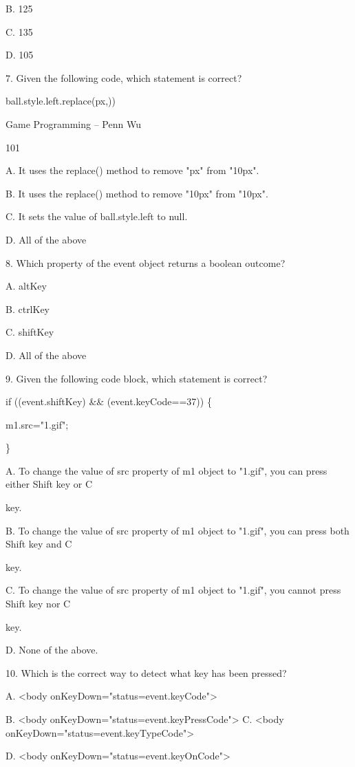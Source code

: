 \documentclass[
]{article}
\begin{document}
B. 125

C. 135

D. 105

7. Given the following code, which statement is correct?

ball.style.left.replace(\textquotesingle px\textquotesingle,\textquotesingle\textquotesingle))

Game Programming -- Penn Wu

101

\protect\hypertarget{index_split_007.htmlux5cux23p102}{}{}A. It uses the
replace() method to remove "px" from "10px".

B. It uses the replace() method to remove "10px" from "10px".

C. It sets the value of ball.style.left to null.

D. All of the above

8. Which property of the event object returns a boolean outcome?

A. altKey

B. ctrlKey

C. shiftKey

D. All of the above

9. Given the following code block, which statement is correct?

if ((event.shiftKey) \&\& (event.keyCode==37)) \{

m1.src="1.gif";

\}

A. To change the value of src property of m1 object to "1.gif", you can
press either Shift key or C

key.

B. To change the value of src property of m1 object to "1.gif", you can
press both Shift key and C

key.

C. To change the value of src property of m1 object to "1.gif", you
cannot press Shift key nor C

key.

D. None of the above.

10. Which is the correct way to detect what key has been pressed?

A. \textless body onKeyDown="status=event.keyCode"\textgreater{}

B. \textless body onKeyDown="status=event.keyPressCode"\textgreater{} C.
\textless body onKeyDown="status=event.keyTypeCode"\textgreater{}

D. \textless body onKeyDown="status=event.keyOnCode"\textgreater{}
\end{document}
